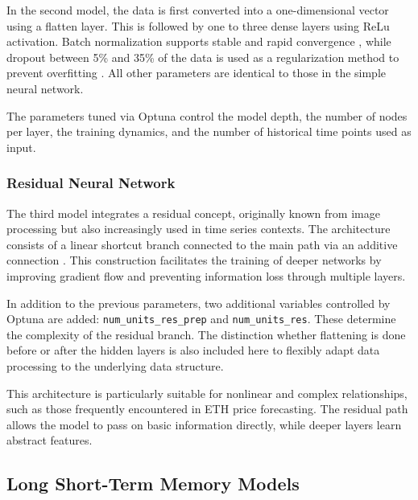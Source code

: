 In the second model, the data is first converted into a one-dimensional vector using a flatten layer.
This is followed by one to three dense layers using ReLu activation.
Batch normalization supports stable and rapid convergence \cite{batch-normalization}, while dropout between 5\% and 35\% of the data is used as a regularization method to prevent overfitting \cite{keras-dropout}.
All other parameters are identical to those in the simple neural network.

The parameters tuned via Optuna control the model depth, the number of nodes per layer, the training dynamics, and the number of historical time points used as input.



\subsubsection{Residual Neural Network}

The third model integrates a residual concept, originally known from image processing but also increasingly used in time series contexts.
The architecture consists of a linear shortcut branch connected to the main path via an additive connection \cite{residual-nn}.
This construction facilitates the training of deeper networks by improving gradient flow and preventing information loss through multiple layers.

In addition to the previous parameters, two additional variables controlled by Optuna are added: \verb|num_units_res_prep| and \verb|num_units_res|.
These determine the complexity of the residual branch.
The distinction whether flattening is done before or after the hidden layers is also included here to flexibly adapt data processing to the underlying data structure.

This architecture is particularly suitable for nonlinear and complex relationships, such as those frequently encountered in ETH price forecasting.
The residual path allows the model to pass on basic information directly, while deeper layers learn abstract features.



\subsection{Long Short-Term Memory Models}
\label{chap:lstm}

